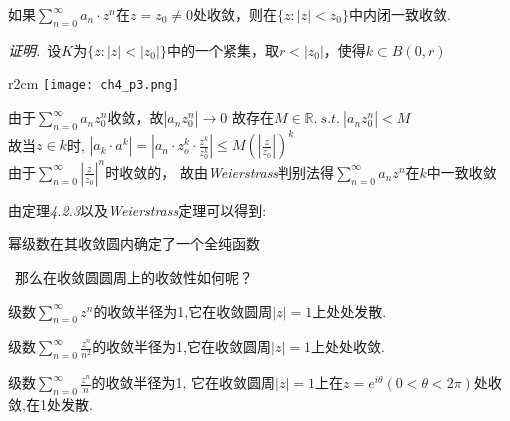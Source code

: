 \begin{mypro}[Abel I]
    如果$\displaystyle{\sum\limits_{n=0}^\infty a_n\cdot z^n}$在$z=z_0\neq0$处收敛，则在$\{z:|z|<z_0\}$中内闭一致收敛.
\end{mypro}
\noindent\emph{证明.}\ 设$K$为$\{z:|z|<|z_0|\}$中的一个紧集，取$r<|z_0|$，使得$k\subset B(0,r)$
\begin{wrapfigure}[4]{r}{2cm}
    \centering
    \texttt{[image: ch4\_p3.png]}
\end{wrapfigure}
由于$\displaystyle{\sum\limits_{n=0}^\infty a_nz_0^n}$收敛，故$\left|a_nz_0^n\right|\rightarrow0$
故存在$M\in\mathbb{R}.\ s.t.\ \left|a_nz_0^n\right|<M$\\
故当$z\in k$时,
$\displaystyle{\left|a_k\cdot a^k\right|=\left|a_n\cdot z_o^k\cdot \frac{z^k}{z_0^k}\right|\leq M\left(\left|\frac{z}{z_0}\right|\right)^k}$\\
由于$\displaystyle{\sum\limits_{n=0}^\infty\left|\frac{z}{z_0}\right|^n}$时收敛的，
故由\emph{Weierstrass}判别法得$\displaystyle{\sum\limits_{n=0}^\infty a_nz^n}$在$k$中一致收敛\\\rightline{$\square$}


\noindent 由定理\emph{4.2.3}以及\emph{Weierstrass}定理可以得到:

\begin{mypro}
    幂级数在其收敛圆内确定了一个全纯函数\par
    \qquad\quad\, 那么在收敛圆圆周上的收敛性如何呢？
\end{mypro}

\begin{eg}
    级数$\displaystyle{\sum\limits_{n=0}^\infty z^n}$的收敛半径为1,它在收敛圆周$|z|=1$上处处发散.
\end{eg}

\begin{eg}
    级数$\displaystyle{\sum\limits_{n=0}^\infty \frac{z^n}{n^2}}$的收敛半径为1,它在收敛圆周$|z|=1$上处处收敛.
\end{eg}

\begin{eg}
    级数$\displaystyle{\sum\limits_{n=0}^\infty \frac{z^n}{n}}$的收敛半径为1,
    它在收敛圆周$|z|=1$上在$z=e^{i\theta}(0<\theta<2\pi)$处收敛,在1处发散.
\end{eg}

